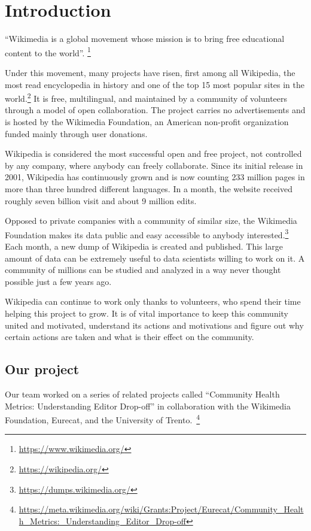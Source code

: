 \chapter{Introduction}
\label{cha:introduction}

“Wikimedia is a global movement whose mission is to bring free educational content to the world”. \footnote{\url{https://www.wikimedia.org/}}


Under this movement, many projects have risen, first among all Wikipedia, the most read encyclopedia in history and one of the top 15 most popular sites in the world.\footnote{\url{https://wikipedia.org/}} It is free, multilingual, and maintained by a community of volunteers through a model of open collaboration. The project carries no advertisements and is hosted by the Wikimedia Foundation, an American non-profit organization funded mainly through user donations.


Wikipedia is considered the most successful open and free project, not controlled by any company, where anybody can freely collaborate. Since its initial release in 2001, Wikipedia has continuously grown and is now counting 233 million pages in more than three hundred different languages. In a month, the website received roughly seven billion visit and about 9 million edits.


Opposed to private companies with a community of similar size, the Wikimedia Foundation makes its data public and easy accessible to anybody interested.\footnote{\url{https://dumps.wikimedia.org/}} Each month, a new dump of Wikipedia is created and published. This large amount of data can be extremely useful to data scientists willing to work on it. A community of millions can be studied and analyzed in a way never thought possible just a few years ago.


Wikipedia can continue to work only thanks to volunteers, who spend their time helping this project to grow. It is of vital importance to keep this community united and motivated, understand its actions and motivations and figure out why certain actions are taken and what is their effect on the community.

\section{Our project}
\label{sec:ourproject}

Our team worked on a series of related projects called “Community Health Metrics: Understanding Editor Drop-off” in collaboration with the Wikimedia Foundation, Eurecat, and the University of Trento.~\footnote{\url{https://meta.wikimedia.org/wiki/Grants:Project/Eurecat/Community_Health_Metrics:_Understanding_Editor_Drop-off}}


